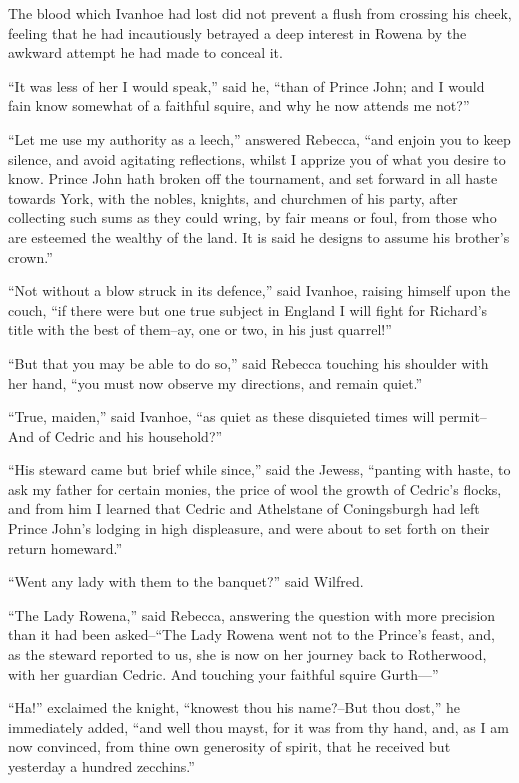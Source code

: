 The blood which Ivanhoe had lost did not prevent a flush from crossing
his cheek, feeling that he had incautiously betrayed a deep interest in
Rowena by the awkward attempt he had made to conceal it.

``It was less of her I would speak,'' said he, ``than of Prince John;
and I would fain know somewhat of a faithful squire, and why he now
attends me not?''

``Let me use my authority as a leech,'' answered Rebecca, ``and enjoin
you to keep silence, and avoid agitating reflections, whilst I apprize
you of what you desire to know. Prince John hath broken off the
tournament, and set forward in all haste towards York, with the nobles,
knights, and churchmen of his party, after collecting such sums as they
could wring, by fair means or foul, from those who are esteemed the
wealthy of the land. It is said he designs to assume his brother's
crown.''

``Not without a blow struck in its defence,'' said Ivanhoe, raising
himself upon the couch, ``if there were but one true subject in England
I will fight for Richard's title with the best of them--ay, one or two,
in his just quarrel!''

``But that you may be able to do so,'' said Rebecca touching his
shoulder with her hand, ``you must now observe my directions, and remain
quiet.''

``True, maiden,'' said Ivanhoe, ``as quiet as these disquieted times
will permit--And of Cedric and his household?''

``His steward came but brief while since,'' said the Jewess, ``panting
with haste, to ask my father for certain monies, the price of wool the
growth of Cedric's flocks, and from him I learned that Cedric and
Athelstane of Coningsburgh had left Prince John's lodging in high
displeasure, and were about to set forth on their return homeward.''

``Went any lady with them to the banquet?'' said Wilfred.

``The Lady Rowena,'' said Rebecca, answering the question with more
precision than it had been asked--``The Lady Rowena went not to the
Prince's feast, and, as the steward reported to us, she is now on her
journey back to Rotherwood, with her guardian Cedric. And touching your
faithful squire Gurth---''

``Ha!'' exclaimed the knight, ``knowest thou his name?--But thou dost,''
he immediately added, ``and well thou mayst, for it was from thy hand,
and, as I am now convinced, from thine own generosity of spirit, that he
received but yesterday a hundred zecchins.''

